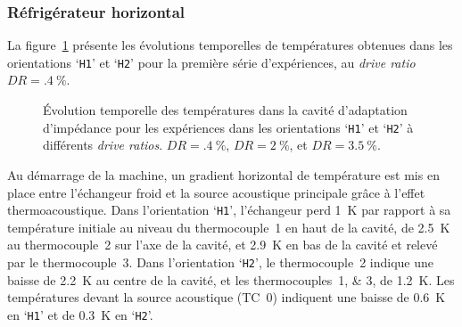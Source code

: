 \subsubsection{Réfrigérateur horizontal}
La figure~\ref{fig:Acou_CHXout_H1H2_Low} présente les évolutions temporelles de températures obtenues dans les orientations `\texttt{H1}' et `\texttt{H2}' pour la première série d'expériences, au \textit{drive ratio} $DR=\qty{.4}{\percent}$.\medskip

\begin{figure}[!htp]
	\centering
\begin{subfigure}{.97\textwidth}
    \centering
    
    \caption{}
    \label{fig:Acou_CHXout_H1H2_Low}
\end{subfigure}

\vspace{1em}

\begin{subfigure}{.97\textwidth}
    \centering
    
    \caption{}
    \label{fig:Acou_CHXout_H1H2_Mid}
\end{subfigure}

\vspace{1em}

\begin{subfigure}{.97\textwidth}
    \centering
    
    \caption{}
    \label{fig:Acou_CHXout_H1H2_High}
\end{subfigure}
\caption{\'Evolution temporelle des températures dans la cavité d'adaptation d'impédance pour les expériences dans les orientations `\texttt{H1}' et `\texttt{H2}' à différents \textit{drive ratios}.  $DR=\qty{.4}{\percent}$,  $DR=\qty{2}{\percent}$, et  $DR=\qty{3.5}{\percent}$.}
\label{fig:Acou_CHXout_H1H2}
\end{figure}

Au démarrage de la machine, un gradient horizontal de température est mis en place entre l'échangeur froid et la source acoustique principale grâce à l'effet thermoacoustique. Dans l'orientation `\texttt{H1}', l'échangeur perd \qty{1}{\kelvin} par rapport à sa température initiale au niveau du thermocouple~\num{1} en haut de la cavité, de \qty{2.5}{\kelvin} au thermocouple~\num{2} sur l'axe de la cavité, et \qty{2.9}{\kelvin} en bas de la cavité et relevé par le thermocouple~\num{3}. Dans l'orientation `\texttt{H2}', le thermocouple~\num{2} indique une baisse de \qty{2.2}{\kelvin} au centre de la cavité, et les thermocouples~\numlist{1;3}, de \qty{1.2}{\kelvin}. Les températures devant la source acoustique (TC~\num{0}) indiquent une baisse de \qty{.6}{\kelvin} en `\texttt{H1}' et de \qty{.3}{\kelvin} en `\texttt{H2}'. 

